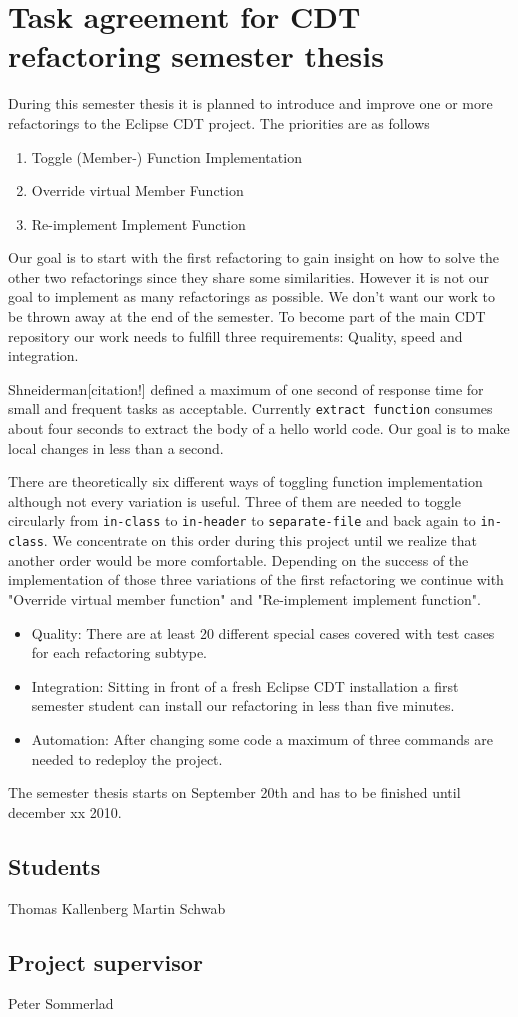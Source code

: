 \documentclass[a4paper,10pt]{scrreprt}
\begin{document}
\section*{Task agreement for CDT refactoring semester thesis}

During this semester thesis it is planned to introduce and improve one or more refactorings to the Eclipse CDT project. The priorities are as follows

\begin{enumerate}
\item Toggle (Member-) Function Implementation
\item Override virtual Member Function
\item Re-implement Implement Function
\end{enumerate}

Our goal is to start with the first refactoring to gain insight on how to solve the other two refactorings since they share some similarities. However it is not our goal to implement as many refactorings as possible. We don't want our work to be thrown away at the end of the semester. To become part of the main CDT repository our work needs to fulfill three requirements: Quality, speed and integration. 

Shneiderman[citation!] defined a maximum of one second of response time for small and frequent tasks as acceptable. Currently \texttt{extract function} consumes about four seconds to extract the body of a hello world code. Our goal is to make local changes in less than a second. 

There are theoretically six different ways of toggling function implementation although not every variation is useful. Three of them are needed to toggle circularly from \texttt{in-class} to \texttt{in-header} to \texttt{separate-file} and back again to \texttt{in-class}. We concentrate on this order during this project until we realize that another order would be more comfortable. Depending on the success of the implementation of those three variations of the first refactoring we continue with "Override virtual member function" and "Re-implement implement function". 

\begin{itemize} %
\item Quality: There are at least 20 different special cases covered with test cases for each refactoring subtype.
\item Integration: Sitting in front of a fresh Eclipse CDT installation a first semester student can install our refactoring in less than five minutes.
\item Automation: After changing some code a maximum of three commands are needed to redeploy the project.
\end{itemize}

The semester thesis starts on September 20th and has to be finished until december xx 2010.

\subsection*{Students}
Thomas Kallenberg \dotfill
Martin Schwab \dotfill
\subsection*{Project supervisor}
Peter Sommerlad \dotfill
\end{document}
